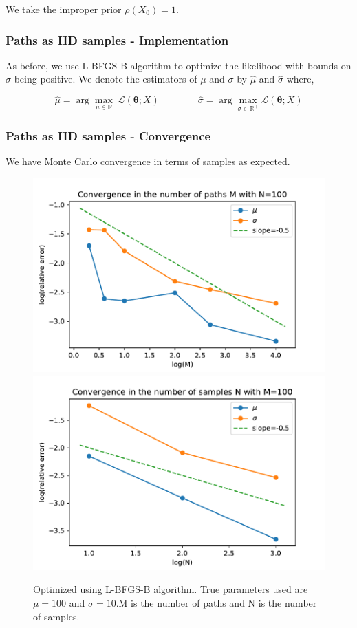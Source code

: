 \documentclass[aspectratio=169]{beamer}\usepackage[utf8]{inputenc}
\newcommand{\R}{\mathbb{R}}
\begin{document}
{\begin{frame}
We take the improper prior $\rho(X_0)=1$.

\end{frame}

\begin{frame}\frametitle{ Paths as IID samples - Implementation }

As before, we use  L-BFGS-B algorithm to optimize the likelihood with bounds on $\sigma$ being positive. We denote the estimators of $\mu$ and $\sigma$ by  $\hat{\mu}$ and $\hat{\sigma}$ where,

\begin{equation}
 \hat{\mu} = \arg \underset{\mu \in \R}{\max} \ \mathcal{L}(\bm{\theta};X) \quad \quad  \quad \quad \hat{\sigma} = \arg \underset{\sigma \in \R^+}{\max} \mathcal{L}(\bm{\theta};X)
\end{equation}

\end{frame}

\begin{frame}\frametitle{ Paths as IID samples - Convergence }
We have Monte Carlo convergence in terms of samples as expected.
\begin{figure}
  \includegraphics[scale=0.5]{Figures/conv_M_unbounded.pdf}
   \includegraphics[scale=0.5]{Figures/conv_N_unbounded.pdf}
  \caption{ Optimized using L-BFGS-B algorithm. True parameters used are $\mu = 100$ and $\sigma = 10$.M is the number of paths and N is the number of samples.    }
\end{figure}


\end{frame}}
\end{document}
